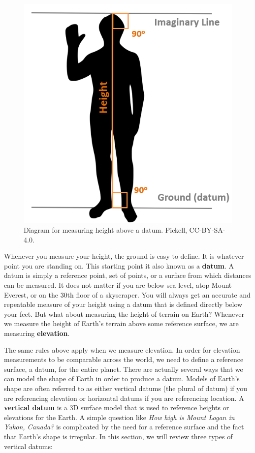 \documentclass[
]{book}
\begin{document}
\begin{figure}
\includegraphics[width=0.75\linewidth]{images/02-height} \caption{Diagram for measuring height above a datum. Pickell, CC-BY-SA-4.0.}\label{fig:2-height}
\end{figure}

Whenever you measure your height, the ground is easy to define. It is whatever point you are standing on. This starting point it also known as a \textbf{datum}. A datum is simply a reference point, set of points, or a surface from which distances can be measured. It does not matter if you are below sea level, atop Mount Everest, or on the 30th floor of a skyscraper. You will always get an accurate and repeatable measure of your height using a datum that is defined directly below your feet. But what about measuring the height of terrain on Earth? Whenever we measure the height of Earth's terrain above some reference surface, we are measuring \textbf{elevation}.

The same rules above apply when we measure elevation. In order for elevation measurements to be comparable across the world, we need to define a reference surface, a datum, for the entire planet. There are actually several ways that we can model the shape of Earth in order to produce a datum. Models of Earth's shape are often referred to as either vertical datums (the plural of datum) if you are referencing elevation or horizontal datums if you are referencing location. A \textbf{vertical datum} is a 3D surface model that is used to reference heights or elevations for the Earth. A simple question like \emph{How high is Mount Logan in Yukon, Canada?} is complicated by the need for a reference surface and the fact that Earth's shape is irregular. In this section, we will review three types of vertical datums:
\end{document}
